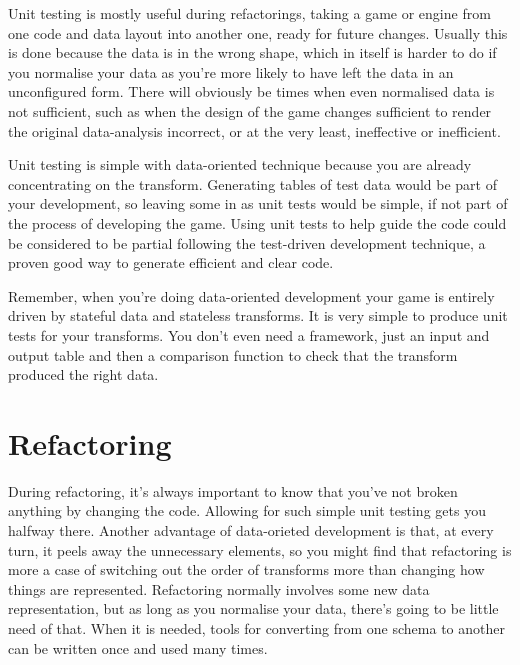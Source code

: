 Unit testing is mostly useful during refactorings, taking a game or engine from
one code and data layout into another one, ready for future changes. Usually
this is done because the data is in the wrong shape, which in itself is harder
to do if you normalise your data as you're more likely to have left the data in
an unconfigured form. There will obviously be times when even normalised data
is not sufficient, such as when the design of the game changes sufficient to
render the original data-analysis incorrect, or at the very least, ineffective
or inefficient.

Unit testing is simple with data-oriented technique because you are already
concentrating on the transform. Generating tables of test data would be part of
your development, so leaving some in as unit tests would be simple, if not part
of the process of developing the game. Using unit tests to help guide the code
could be considered to be partial following the test-driven development
technique, a proven good way to generate efficient and clear code.

Remember, when you're doing data-oriented development your game is entirely
driven by stateful data and stateless transforms. It is very simple to produce
unit tests for your transforms. You don't even need a framework, just an input
and output table and then a comparison function to check that the transform
produced the right data.

\section{Refactoring}

During refactoring, it's always important to know that you've not broken
anything by changing the code. Allowing for such simple unit testing gets you
halfway there. Another advantage of data-orieted development is that, at every
turn, it peels away the unnecessary elements, so you might find that
refactoring is more a case of switching out the order of transforms more than
changing how things are represented. Refactoring normally involves some new
data representation, but as long as you normalise your data, there's going to
be little need of that. When it is needed, tools for converting from one schema
to another can be written once and used many times.

